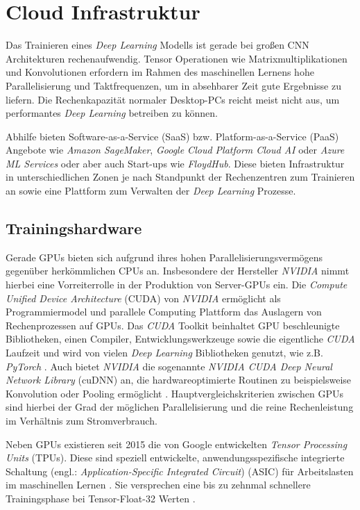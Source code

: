 \section{Cloud Infrastruktur} \label{cloud}

Das Trainieren eines \textit{Deep Learning} Modells ist gerade bei großen CNN Architekturen rechenaufwendig. Tensor Operationen wie Matrixmultiplikationen und Konvolutionen erfordern im Rahmen des maschinellen Lernens hohe Parallelisierung und Taktfrequenzen, um in absehbarer Zeit gute Ergebnisse zu liefern. Die Rechenkapazität normaler Desktop-PCs reicht meist nicht aus, um performantes \textit{Deep Learning} betreiben zu können. 

Abhilfe bieten Software-as-a-Service (SaaS) bzw. Platform-as-a-Service (PaaS) Angebote wie \textit{Amazon SageMaker}, \textit{Google Cloud Platform Cloud AI} oder \textit{Azure ML Services} oder aber auch Start-ups wie \textit{FloydHub}. Diese bieten Infrastruktur in unterschiedlichen Zonen je nach Standpunkt der Rechenzentren zum Trainieren an sowie eine Plattform zum Verwalten der \textit{Deep Learning} Prozesse. 

\subsection*{Trainingshardware}

Gerade GPUs bieten sich aufgrund ihres hohen Parallelisierungsvermögens gegenüber herkömmlichen CPUs an. Insbesondere der Hersteller \textit{NVIDIA} nimmt hierbei eine Vorreiterrolle in der Produktion von Server-GPUs ein. Die \textit{Compute Unified Device Architecture} (CUDA) von \textit{NVIDIA} ermöglicht als Programmiermodel und parallele Computing Plattform das Auslagern von Rechenprozessen auf GPUs. Das \textit{CUDA} Toolkit beinhaltet GPU beschleunigte Bibliotheken, einen Compiler, Entwicklungswerkzeuge sowie die eigentliche \textit{CUDA} Laufzeit und wird von vielen \textit{Deep Learning} Bibliotheken genutzt, wie z.B. \textit{PyTorch} \cite{NVIDIA.20200209, PyTorch.20200209}. Auch bietet \textit{NVIDIA} die sogenannte \textit{NVIDIA CUDA Deep Neural Network Library} (cuDNN) an, die hardwareoptimierte Routinen zu beispielsweise Konvolution oder Pooling ermöglicht \cite{NVIDIA.20200520}. Hauptvergleichskriterien zwischen GPUs sind hierbei der Grad der möglichen Parallelisierung und die reine Rechenleistung im Verhältnis zum Stromverbrauch.

Neben GPUs existieren seit 2015 die von Google entwickelten \textit{Tensor Processing Units} (TPUs). Diese sind speziell entwickelte, anwendungsspezifische integrierte Schaltung (engl.: \textit{Application-Specific Integrated Circuit}) (ASIC) für Arbeitslasten im maschinellen Lernen \cite{GoogleCloud.20200209b}. Sie versprechen eine bis zu zehnmal schnellere Trainingsphase bei Tensor-Float-32 Werten  \cite{NVIDIA.20200524}.

